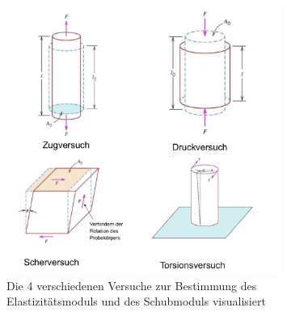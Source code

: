 \documentclass[11pt,a4paper]{article}
\numberwithin{equation}{section}
\numberwithin{figure}{section}
\begin{document}
\begin{addmargin}[25pt]{0pt}
\begin{figure}[h]
    \centering
    \includegraphics[width = 0.8\textwidth]{images/Materialwissenschaften/Modulnversuche.jpeg}
    \caption{Die 4 verschiedenen Versuche zur Bestimmung des Elastizitätsmoduls und des Schubmoduls visualisiert}
    \label{fig:Modulnversuche}
\end{figure}
\end{addmargin} 
\end{document}
